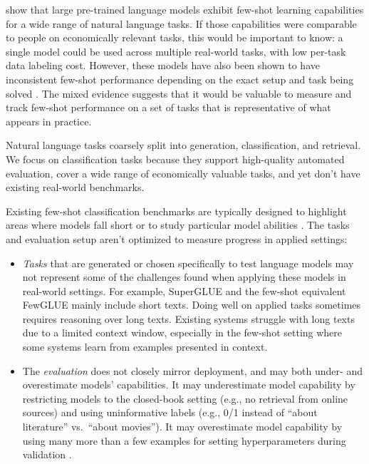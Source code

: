 \documentclass{article}
\begin{document}
\citet{brown2020gpt3} show that large pre-trained language models exhibit few-shot learning capabilities for a wide range of natural language tasks.
If those capabilities were comparable to people on economically relevant tasks, this would be important to know: a single model could be used across multiple real-world tasks, with low per-task data labeling cost.
However, these models have also been shown to have inconsistent few-shot performance depending on the exact setup and task being solved \citep[e.g.][]{mishra2021natural, perez2021true}.
The mixed evidence suggests that it would be valuable to measure and track few-shot performance on a set of tasks that is representative of what appears in practice.

Natural language tasks coarsely split into generation, classification, and retrieval. We focus on classification tasks because they support high-quality automated evaluation, cover a wide range of economically valuable tasks, and yet don't have existing real-world benchmarks.

\begin{comment}
Why existing work doesn't solve it
\end{comment}

Existing few-shot classification benchmarks are typically designed to highlight areas where models fall short \citep{schick2021its} or to study particular model abilities \citep{bragg2021flex, ye2021crossfit, mishra2021natural}. The tasks and evaluation setup aren't optimized to measure progress in applied settings:

\begin{itemize}

\item \textit{Tasks} that are generated or chosen specifically to test language models may not represent some of the challenges found when applying these models in real-world settings. For example, SuperGLUE \citep{wang2019superglue} and the few-shot equivalent FewGLUE \citep{schick2021its} mainly include short texts. Doing well on applied tasks sometimes requires reasoning over long texts. Existing systems struggle with long texts due to a limited context window, especially in the few-shot setting where some systems learn from examples presented in context.

\item The \textit{evaluation} does not closely mirror deployment, and may both under- and overestimate models' capabilities.
It may underestimate model capability by restricting models to the closed-book setting (e.g., no retrieval from online sources) and using uninformative labels (e.g., 0/1 instead of ``about literature'' vs.\ ``about movies'').
It may overestimate model capability by using many more than a few examples for setting hyperparameters during validation \citep{perez2021true}.

\end{itemize}
         
\end{document}
